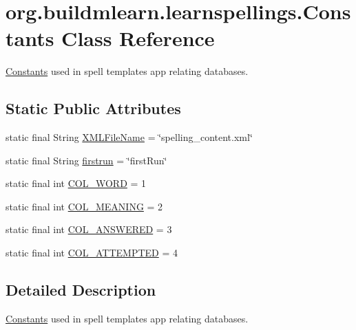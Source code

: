 \hypertarget{classorg_1_1buildmlearn_1_1learnspellings_1_1Constants}{}\section{org.\+buildmlearn.\+learnspellings.\+Constants Class Reference}
\label{classorg_1_1buildmlearn_1_1learnspellings_1_1Constants}


\hyperlink{classorg_1_1buildmlearn_1_1learnspellings_1_1Constants}{Constants} used in spell template\textquotesingle{}s app relating databases.  


\subsection*{Static Public Attributes}
\begin{DoxyCompactItemize}
\item 
static final String \hyperlink{classorg_1_1buildmlearn_1_1learnspellings_1_1Constants_ad11ecec6bb55020516dd2c21de79d350}{X\+M\+L\+File\+Name} = \char`\"{}spelling\+\_\+content.\+xml\char`\"{}
\item 
static final String \hyperlink{classorg_1_1buildmlearn_1_1learnspellings_1_1Constants_a17b97e172ed67da4707a0a2ca1c93b27}{firstrun} = \char`\"{}first\+Run\char`\"{}
\item 
static final int \hyperlink{classorg_1_1buildmlearn_1_1learnspellings_1_1Constants_a3a7026ae1ba03f40b243b7ade9b1fdbe}{C\+O\+L\+\_\+\+W\+O\+RD} = 1
\item 
static final int \hyperlink{classorg_1_1buildmlearn_1_1learnspellings_1_1Constants_ad308d57ad3744b75f50a707da7ef3e75}{C\+O\+L\+\_\+\+M\+E\+A\+N\+I\+NG} = 2
\item 
static final int \hyperlink{classorg_1_1buildmlearn_1_1learnspellings_1_1Constants_ab698f27103cd92ed34e92b0cae9f464e}{C\+O\+L\+\_\+\+A\+N\+S\+W\+E\+R\+ED} = 3
\item 
static final int \hyperlink{classorg_1_1buildmlearn_1_1learnspellings_1_1Constants_a5bcffda7ebe8554ca8f7b18434f82574}{C\+O\+L\+\_\+\+A\+T\+T\+E\+M\+P\+T\+ED} = 4
\end{DoxyCompactItemize}


\subsection{Detailed Description}
\hyperlink{classorg_1_1buildmlearn_1_1learnspellings_1_1Constants}{Constants} used in spell template\textquotesingle{}s app relating databases. 

